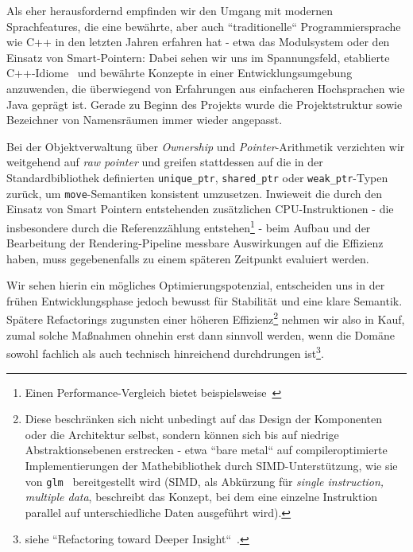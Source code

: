 Als eher herausfordernd empfinden wir den Umgang mit modernen Sprachfeatures, die eine bewährte, aber auch ``traditionelle`` Programmiersprache wie C++ in den letzten Jahren erfahren hat - etwa das Modulsystem oder den Einsatz von Smart-Pointern: Dabei sehen wir uns im Spannungsfeld, etablierte C++-Idiome~\cite[]{IdiomaticCpp} und bewährte Konzepte in einer Entwicklungsumgebung anzuwenden, die überwiegend von Erfahrungen aus einfacheren Hochsprachen wie Java geprägt ist.
Gerade zu Beginn des Projekts wurde die Projektstruktur sowie Bezeichner von Namensräumen immer wieder angepasst.\par

Bei der Objektverwaltung über \textit{Ownership} und \textit{Pointer}-Arithmetik verzichten wir weitgehend auf \textit{raw pointer} und greifen stattdessen auf die in der Standardbibliothek definierten \texttt{unique\_ptr}, \texttt{shared\_ptr} oder \texttt{weak\_ptr}-Typen zurück, um \texttt{move}-Semantiken konsistent umzusetzen.
Inwieweit die durch den Einsatz von Smart Pointern entstehenden zusätzlichen CPU-Instruktionen - die insbesondere durch die Referenzzählung entstehen\footnote{Einen Performance-Vergleich bietet beispielsweise~\cite[]{Val25}} - beim Aufbau und der Bearbeitung der Rendering-Pipeline messbare Auswirkungen auf die Effizienz haben, muss gegebenenfalls zu einem späteren Zeitpunkt evaluiert werden.\par

Wir sehen hierin ein mögliches Optimierungspotenzial, entscheiden uns in der frühen Entwicklungsphase jedoch bewusst für Stabilität und eine klare Semantik.
Spätere  Refactorings zugunsten einer höheren Effizienz\footnote{
Diese beschränken sich nicht unbedingt auf das Design der Komponenten oder die Architektur selbst, sondern können sich bis auf niedrige Abstraktionsebenen erstrecken - etwa ``bare metal`` auf compileroptimierte Implementierungen der Mathebibliothek durch SIMD-Unterstützung, wie sie von \texttt{glm}~\cite[]{glmSimd} bereitgestellt wird (SIMD, als Abkürzung für \textit{single instruction, multiple data}, beschreibt das Konzept, bei dem eine einzelne Instruktion parallel auf unterschiedliche Daten ausgeführt wird).
} nehmen wir also in Kauf, zumal solche Maßnahmen ohnehin erst dann sinnvoll werden, wenn die Domäne sowohl fachlich als auch technisch hinreichend durchdrungen ist\footnote{
   siehe ``Refactoring toward Deeper Insight``~\cite[]{Eva03}.
}.\par


